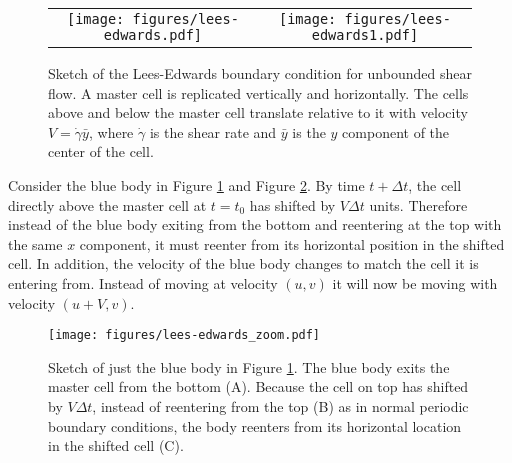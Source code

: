 \begin{figure}[!h]
\begin{center}
\begin{tabular}{c c}
\texttt{[image: figures/lees-edwards.pdf]}&
\texttt{[image: figures/lees-edwards1.pdf]}
\end{tabular}
\end{center}
\caption[Sketch of the Lees-Edwards boundary condition]{Sketch of the Lees-Edwards boundary condition for unbounded shear flow. A master cell is replicated vertically and horizontally. The cells above and below the master cell translate relative to it with velocity $V = \dot{\gamma}\bar{y}$, where $\dot{\gamma}$ is the shear rate and $\bar{y}$ is the $y$ component of the center of the cell.}\label{fig:le1}
\end{figure}

Consider the blue body in Figure \ref{fig:le1} and Figure \ref{fig:le2}. By time $t+\Delta t$, the cell directly above the master cell at $t=t_0$ has shifted by $V\Delta t$ units. Therefore instead of the blue body exiting from the bottom and reentering at the top with the same $x$ component, it must reenter from its horizontal position in the shifted cell. In addition, the velocity of the blue body changes to match the cell it is entering from. Instead of moving at velocity $(u,v)$ it will now be moving with velocity $(u+V, v)$. 

\begin{figure}[!h]
\begin{center}
\texttt{[image: figures/lees-edwards\_zoom.pdf]}
\end{center}
\caption[Enforcement of the Lees-Edwards boundary conditions]{Sketch of just the blue body in Figure \ref{fig:le1}. The blue body exits the master cell from the bottom (A). Because the cell on top has shifted by $V\Delta t$, instead of reentering from the top (B) as in normal periodic boundary conditions, the body reenters from its horizontal location in the shifted cell (C). }\label{fig:le2}
\end{figure}

